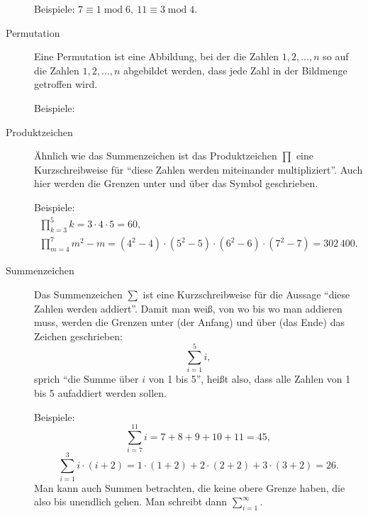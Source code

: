 \documentclass[10pt,a5paper,twoside]{article}
\begin{document}
\begin{description}
Beispiele: $7\equiv 1\operatorname{mod} 6,\ 11\equiv 3\operatorname{mod} 4$.

\item[Permutation] Eine Permutation ist eine Abbildung, bei der die Zahlen $1,2,\dots,n$ so auf die Zahlen $1,2,\dots,n$ abgebildet werden, dass jede Zahl in der Bildmenge getroffen wird. 

Beispiele:
\begin{figure}[H] 
\centering 
\def\svgwidth{200pt} 
 
\end{figure} 

\item[Produktzeichen] Ähnlich wie das Summenzeichen ist das Produktzeichen $\prod$ eine Kurzschreibweise für \enquote{diese Zahlen werden miteinander multipliziert}. Auch hier werden die Grenzen unter und über das Symbol geschrieben. 

Beispiele: 
\begin{gather*}
\prod\limits_{k=3}^5 k = 3\cdot 4\cdot 5 = 60,\\
\prod\limits_{m=4}^7 m^2 - m = (4^2-4)\cdot(5^2-5)\cdot (6^2-6) \cdot (7^2-7)= 302\,400.
\end{gather*}
\item[Summenzeichen] Das Summenzeichen $\sum$ ist eine Kurzschreibweise für die Aussage \enquote{diese Zahlen werden addiert}. 
Damit man weiß, von wo bis wo man addieren muss, werden die Grenzen unter (der Anfang) und über (das Ende) das Zeichen geschrieben:
\begin{equation*}
\sum\limits_{i=1}^5 i,
\end{equation*}
sprich \enquote{die Summe über $i$ von 1 bis 5}, heißt also, dass alle Zahlen von 1 bis 5 aufaddiert werden sollen. 

Beispiele: \[\sum\limits_{i=7}^{11} i= 7+8+9+10+11 = 45,\] 
\[\sum\limits_{i=1}^3 i\cdot (i+2) = 1\cdot (1+2) + 2\cdot (2+2) + 3\cdot (3+2) = 26.\] 
Man kann auch Summen betrachten, die keine obere Grenze haben, die also bis unendlich gehen. Man schreibt dann $\sum\limits_{i=1}^\infty$. 
\end{description}
%
\clearpage
\thispagestyle{empty}
\null

\end{document}
